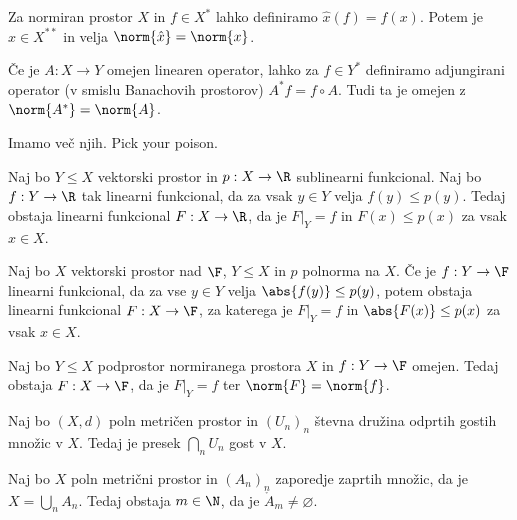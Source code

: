 Za normiran prostor $X$ in $f \in X^*$ lahko definiramo $\hat{x}(f) = f(x)$.
Potem je $\hat{x} \in X^{**}$ in velja $\norm{\hat{x}} =\norm{x}$.

Če je $A: X \to Y$ omejen linearen operator, lahko za $f \in Y^*$ definiramo
adjungirani operator (v smislu Banachovih prostorov) $A^* f = f \circ A$.
Tudi ta je omejen z $\norm{A^*} = \norm{A}$.



Imamo več njih.
Pick your poison.

\begin{izrek}
  Naj bo $Y \le X$ vektorski prostor in $p: X \to \R$ sublinearni funkcional.
  Naj bo $f: Y \to \R$ tak linearni funkcional, da za vsak $y \in Y$ velja $f(y)
  \le p(y)$.
  Tedaj obstaja linearni funkcional $F: X \to \R$, da je $\left. F \right|_Y =
  f$ in $F(x) \le p(x)$ za vsak $x \in X$.
\end{izrek}

\begin{izrek}
  Naj bo $X$ vektorski prostor nad $\F$, $Y \le X$ in $p$ polnorma na $X$.
  Če je $f: Y \to \F$ linearni funkcional, da za vse $y \in Y$ velja $\abs{f(y)}
  \le p(y)$, potem obstaja linearni funkcional $F: X \to \F$, za katerega je
  $\left. F \right|_Y = f$ in $\abs{F(x)} \le p(x)$ za vsak $x \in X$.
\end{izrek}

\begin{izrek}
  Naj bo $Y \le X$ podprostor normiranega prostora $X$ in $f: Y \to \F$ omejen.
  Tedaj obstaja $F: X \to \F$, da je $\left. F \right|_Y = f$ ter $\norm{F} =
  \norm{f}$.
\end{izrek}


\begin{izrek}[Baire]
  Naj bo $(X, d)$ poln metričen prostor in $(U_n)_n$ števna družina odprtih
  gostih množic v $X$.
  Tedaj je presek $\bigcap_n U_n$ gost v $X$.
\end{izrek}

\begin{posledica}
  Naj bo $X$ poln metrični prostor in $(A_n)_n$ zaporedje zaprtih množic, da je
  $X = \bigcup_n A_n$.
  Tedaj obstaja $m \in \N$, da je $\mathring{A}_m \ne \varnothing$.
\end{posledica}

